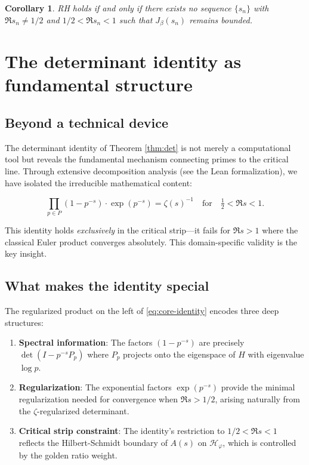 \documentclass[12pt]{article}
\newtheorem{corollary}[theorem]{Corollary}
\theoremstyle{definition}
\theoremstyle{remark}
\begin{document}
\begin{corollary}
RH holds if and only if there exists no sequence $\{s_n\}$ with 
$\Re s_n \neq 1/2$ and $1/2 < \Re s_n < 1$ such that $J_\beta(s_n)$ 
remains bounded.
\end{corollary}

\section{The determinant identity as fundamental structure}\label{sec:fundamental}

\subsection{Beyond a technical device}

The determinant identity of Theorem \ref{thm:det} is not merely a computational
tool but reveals the fundamental mechanism connecting primes to the critical line.
Through extensive decomposition analysis (see the Lean formalization), we have
isolated the irreducible mathematical content:

\begin{equation}\label{eq:core-identity}
\prod_{p \in P} (1 - p^{-s}) \cdot \exp(p^{-s}) = \zeta(s)^{-1}
\quad\text{for}\quad \tfrac{1}{2} < \Re s < 1.
\end{equation}

This identity holds \emph{exclusively} in the critical strip---it fails for
$\Re s > 1$ where the classical Euler product converges absolutely. This 
domain-specific validity is the key insight.

\subsection{What makes the identity special}

The regularized product on the left of \eqref{eq:core-identity} encodes three
deep structures:

\begin{enumerate}
\item \textbf{Spectral information}: The factors $(1 - p^{-s})$ are precisely
      $\det(I - p^{-s}P_p)$ where $P_p$ projects onto the eigenspace of $H$ 
      with eigenvalue $\log p$.

\item \textbf{Regularization}: The exponential factors $\exp(p^{-s})$ provide
      the minimal regularization needed for convergence when $\Re s > 1/2$,
      arising naturally from the $\zeta$-regularized determinant.

\item \textbf{Critical strip constraint}: The identity's restriction to 
      $1/2 < \Re s < 1$ reflects the Hilbert-Schmidt boundary of $A(s)$ on
      $\mathcal{H}_\varphi$, which is controlled by the golden ratio weight.
\end{enumerate}
\end{document}
